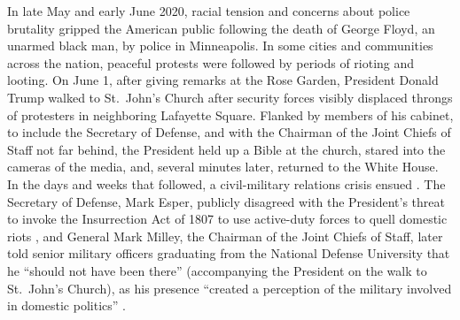 \documentclass[12pt,]{article}
\begin{document}
In late May and early June 2020, racial tension and concerns about police brutality gripped the American public following the death of George Floyd, an unarmed black man, by police in Minneapolis. In some cities and communities across the nation, peaceful protests were followed by periods of rioting and looting. On June 1, after giving remarks at the Rose Garden, President Donald Trump walked to St.~John's Church after security forces visibly displaced throngs of protesters in neighboring Lafayette Square. Flanked by members of his cabinet, to include the Secretary of Defense, and with the Chairman of the Joint Chiefs of Staff not far behind, the President held up a Bible at the church, stared into the cameras of the media, and, several minutes later, returned to the White House. In the days and weeks that followed, a civil-military relations crisis ensued \autocite{feaver_military_2020}. The Secretary of Defense, Mark Esper, publicly disagreed with the President's threat to invoke the Insurrection Act of 1807 to use active-duty forces to quell domestic riots \autocite{esper_secretary_2020}, and General Mark Milley, the Chairman of the Joint Chiefs of Staff, later told senior military officers graduating from the National Defense University that he ``should not have been there'' (accompanying the President on the walk to St.~John's Church), as his presence ``created a perception of the military involved in domestic politics'' \autocite{milley_official_2020}.
\end{document}

